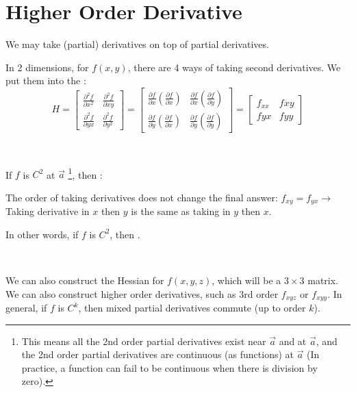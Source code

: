 \documentclass[11pt,fleqn]{book} %
\begin{document}
\section{Higher Order Derivative}

We may take (partial) derivatives on top of partial derivatives. 

In 2 dimensions, for $f(x, y)$, there are 4 ways of taking second derivatives. We put them into the : 
$$H = \begin{bmatrix}
    \frac{\partial^2 f}{\partial x^2} & \frac{\partial^2 f}{\partial xy}  \\
    \frac{\partial^2 f}{\partial yx}  & \frac{\partial^2 f}{\partial y^2}
\end{bmatrix} = \begin{bmatrix}
    \frac{\partial f}{\partial x}\left( \frac{\partial f}{\partial x} \right) & 
    \frac{\partial f}{\partial x}\left( \frac{\partial f}{\partial y} \right)   \\
    \frac{\partial f}{\partial y}\left( \frac{\partial f}{\partial x} \right) & 
    \frac{\partial f}{\partial y}\left( \frac{\partial f}{\partial y} \right)
\end{bmatrix} = \begin{bmatrix}
    f_{xx} & f{xy} \\ f{yx} & f{yy}
\end{bmatrix}$$

{~~~}

If $f$ is $C^2$ at $\vec{a}$ \footnote{This means all the 2nd order partial derivatives exist near $\vec{a}$ and at $\vec{a}$, and the 2nd order partial derivatives are continuous (as functions) at $\vec{a}$ (In practice, a function can fail to be continuous when there is division by zero). }, then :

The order of taking derivatives does not change the final answer: $f_{xy} = f_{yx} \to$ Taking derivative in $x$ then $y$ is the same as taking in $y$ then $x$.

In other words, if $f$ is $C^2$, then .

{~~~}

We can also construct the Hessian for $f(x, y, z)$, which will be a $3 \times 3$ matrix. We can also construct higher order derivatives, such as 3rd order $f_{xyz}$ or $f_{xyy}$. In general, if $f$ is $C^k$, then mixed partial derivatives commute (up to order $k$).
\end{document}
